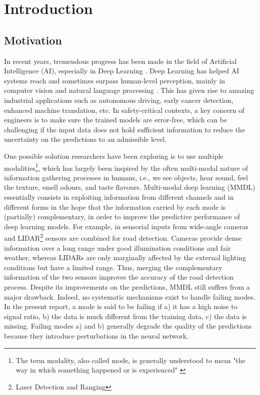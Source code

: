 
\chapter{Introduction} 
\label{chapter-introduction} 


\section{Motivation}

In recent years, tremendous progress has been made in the field of Artificial Intelligence (AI), especially in Deep Learning \citep{lecun-dl, deeplearning-overview}. Deep Learning has helped AI systems reach and sometimes surpass human-level perception, mainly in computer vision \citep{image-recognition} and natural language processing \citep{machine-translation}. This has given rise to amazing industrial applications such as autonomous driving, early cancer detection, enhanced machine translation, etc. In safety-critical contexts, a key concern of engineers is to make sure the trained models are error-free, which can be challenging if the input data does not hold sufficient information to reduce the uncertainty on the predictions to an admissible level.

One possible solution researchers have been exploring is to use multiple modalities\footnote{The term modality, also called mode, is generally understood to mean "the way in which something happened or is experienced" \citep{taxomany-multimodal}}, which has largely been inspired by the often multi-modal nature of information gathering processes in humans, i.e., we see objects, hear sound, feel the texture, smell odours, and taste flavours. Multi-modal deep learning (MMDL) essentially consists in exploiting information from different channels and in different forms in the hope that the information carried by each mode is (partially) complementary, in order to improve the predictive performance of deep learning models. For example, in \citep{lidar-camera} sensorial inputs from wide-angle cameras and LIDAR\footnote{Laser Detection and Ranging} sensors are combined for road detection. Cameras provide dense information over a long range under good illumination conditions and fair weather, whereas LIDARs are only marginally affected by the external lighting conditions but have a limited range. Thus, merging the complementary information of the two sensors improves the accuracy of the road detection process. Despite its improvements on the predictions, MMDL still suffers from a major drawback. Indeed, no systematic mechanisms exist to handle failing modes. In the present report, a mode is said to be failing if a) it has a high noise to signal ratio, b) the data is much different from the training data, c) the data is missing. Failing modes a) and b) generally degrade the quality of the predictions because they introduce perturbations in the neural network.

